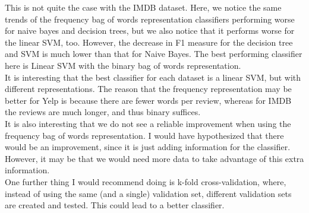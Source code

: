 \documentclass[11pt]{article}
\begin{document}
This is not quite the case with the IMDB dataset. Here, we notice the same trends of the frequency bag of words representation classifiers performing worse for naive bayes and decision trees, but we also notice that it performs worse for the linear SVM, too. However, the decrease in F1 measure for the decision tree and SVM is much lower than that for Naive Bayes. The best performing classifier here is Linear SVM with the binary bag of words representation.\\

It is interesting that the best classifier for each dataset is a linear SVM, but with different representations. The reason that the frequency representation may be better for Yelp is because there are fewer words per review, whereas for IMDB the reviews are much longer, and thus binary suffices.\\

It is also interesting that we do not see a reliable improvement when using the frequency bag of words representation. I would have hypothesized that there would be an improvement, since it is just adding information for the classifier. However, it may be that we would need more data to take advantage of this extra information.\\

One further thing I would recommend doing is k-fold cross-validation, where, instead of using the same (and a single) validation set, different validation sets are created and tested. This could lead to a better classifier.
\end{document}

